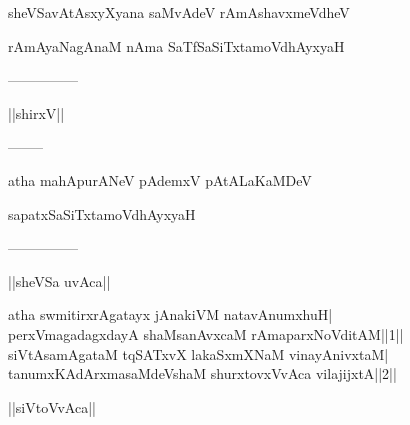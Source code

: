 \documentclass{article}
\begin{document}
\begin{center}
sheVSavAtAsxyXyana saMvAdeV rAmAshavxmeVdheV
\end{center}

\begin{center}
rAmAyaNagAnaM nAma SaTfSaSiTxtamoVdhAyxyaH
\end{center}

\begin{center}
---------------
\end{center}

\begin{center}
||shirxV||
\end{center}

\begin{center}
--------
\end{center}

\begin{center}
atha mahApurANeV pAdemxV pAtALaKaMDeV
\end{center}

\begin{center}
sapatxSaSiTxtamoVdhAyxyaH
\end{center}

\begin{center}
---------------
\end{center}

\begin{center}
||sheVSa uvAca||
\end{center}

atha swmitirxrAgatayx jAnakiVM natavAnumxhuH|\\
perxVmagadagxdayA shaMsanAvxcaM rAmaparxNoVditAM||1||\\
siVtAsamAgataM tqSATxvX lakaSxmXNaM vinayAnivxtaM|\\
tanumxKAdArxmasaMdeVshaM shurxtovxVvAca vilajijxtA||2||\\

\begin{center}
||siVtoVvAca||
\end{center}
\end{document}
